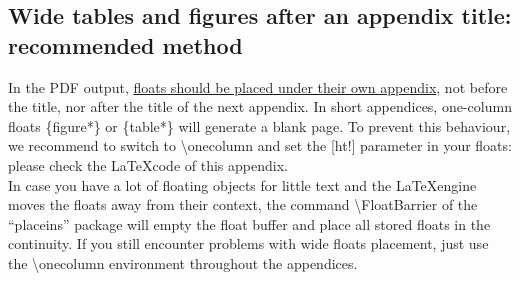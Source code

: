 \documentclass{aa}
\begin{document}
\begin{appendix}





	\onecolumn
	\section{Wide tables and figures after an appendix title: recommended method}

	In the PDF output, \underline{floats should be placed
		under their own appendix}, not before the title, nor after the
	title of the next appendix. In short appendices, one-column floats
	\{figure*\} or \{table*\} will generate
	a blank page. To prevent this behaviour, we recommend to switch
	to \textbackslash onecolumn and set the [ht!] parameter
	in your floats: please check the \LaTeX code of this appendix.\\

	In case you have a lot of floating objects for little text and the
	\LaTeX engine moves the floats away from their context, the command
	\textbackslash FloatBarrier of the “placeins” package will empty the
	float buffer and place all stored floats in the continuity. If you still encounter problems with wide floats placement, just use the \textbackslash onecolumn
	environment throughout the appendices.



\end{appendix}
\end{document}
